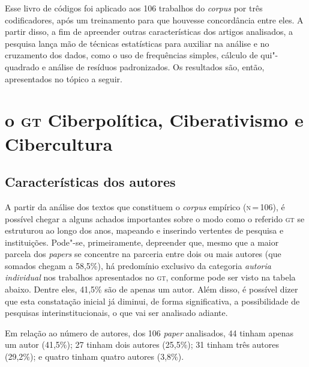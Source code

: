 {Esse livro de códigos foi aplicado aos 106 trabalhos do \textit{corpus}
por três codificadores, após um treinamento para que houvesse
concordância entre eles. A partir disso, a fim de apreender outras
características dos artigos analisados, a pesquisa lança mão de técnicas
estatísticas para auxiliar na análise e no cruzamento dos dados, como o
uso de frequências simples, cálculo de qui"-quadrado e análise de
resíduos padronizados. Os resultados são, então, apresentados no tópico
a seguir.

\section{o \textsc{gt} Ciberpolítica, Ciberativismo e
Cibercultura}

\subsection{Características dos autores}

A partir da análise dos textos que constituem o \textit{corpus} empírico
(\textsc{n}\,=\,106), é possível chegar a alguns achados importantes sobre o modo
como o referido \textsc{gt} se estruturou ao longo dos anos, mapeando e inserindo
vertentes de pesquisa e instituições. Pode"-se, primeiramente, depreender
que, mesmo que a maior parcela dos \textit{papers} se concentre na
parceria entre dois ou mais autores (que somados chegam a 58,5\%), há
predomínio exclusivo da categoria \textit{autoria individual} nos trabalhos
apresentados no \textsc{gt}, conforme pode ser visto na tabela abaixo. Dentre
eles, 41,5\% são de apenas um autor. Além disso, é possível dizer
que esta constatação inicial já diminui, de forma significativa, a
possibilidade de pesquisas interinstitucionais, o que vai ser analisado
adiante.

Em relação ao número de autores, dos 106 \textit{paper} analisados, 44 tinham apenas um autor (41,5\%); 27 tinham dois autores (25,5\%); 31 tinham três autores (29,2\%); e quatro tinham quatro autores (3,8\%).

}
